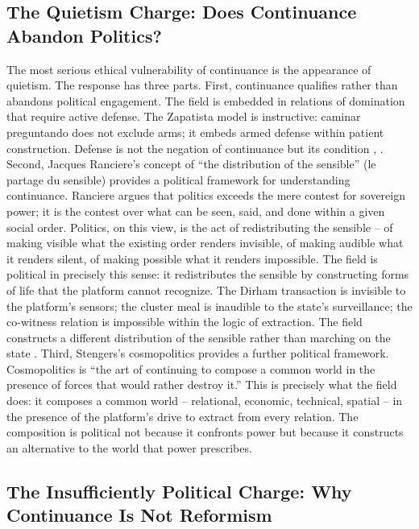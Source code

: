 \subsection{The Quietism Charge: Does Continuance Abandon Politics?}

The most serious ethical vulnerability of continuance is the appearance of quietism. The response has three parts. First, continuance qualifies rather than abandons political engagement. The field is embedded in relations of domination that require active defense. The Zapatista model is instructive: caminar preguntando does not exclude arms; it embeds armed defense within patient construction. Defense is not the negation of continuance but its condition \cite{marcos_1995}, \cite{esteva_2014}. Second, Jacques Ranciere’s concept of “the distribution of the sensible” (le partage du sensible) provides a political framework for understanding continuance. Ranciere argues that politics exceeds the mere contest for sovereign power; it is the contest over what can be seen, said, and done within a given social order. Politics, on this view, is the act of redistributing the sensible – of making visible what the existing order renders invisible, of making audible what it renders silent, of making possible what it renders impossible. The field is political in precisely this sense: it redistributes the sensible by constructing forms of life that the platform cannot recognize. The Dirham transaction is invisible to the platform’s sensors; the cluster meal is inaudible to the state’s surveillance; the co-witness relation is impossible within the logic of extraction. The field constructs a different distribution of the sensible rather than marching on the state \cite[pp.~12-13, 36-43]{ranciere_2000}. Third, Stengers’s cosmopolitics provides a further political framework. Cosmopolitics is “the art of continuing to compose a common world in the presence of forces that would rather destroy it.” This is precisely what the field does: it composes a common world – relational, economic, technical, spatial – in the presence of the platform’s drive to extract from every relation. The composition is political not because it confronts power but because it constructs an alternative to the world that power prescribes.

\subsection{The Insufficiently Political Charge: Why Continuance Is Not Reformism}

